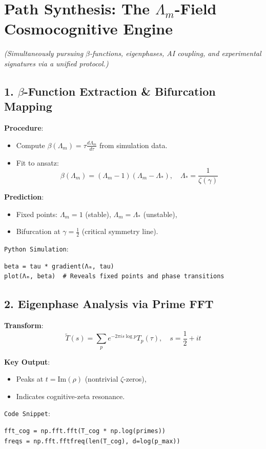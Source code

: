\documentclass[12pt]{article}
\theoremstyle{plain}
\begin{document}
\section*{Path Synthesis: The \(\Lambda_m\)-Field Cosmocognitive Engine}
\textit{(Simultaneously pursuing \(\beta\)-functions, eigenphases, AI coupling, and experimental signatures via a unified protocol.)}

\subsection*{1. \(\beta\)-Function Extraction \& Bifurcation Mapping}
\textbf{Procedure}:
\begin{itemize}
    \item Compute \(\beta(\Lambda_m) = \tau \frac{d\Lambda_m}{d\tau}\) from simulation data.
    \item Fit to ansatz:
    \[
    \beta(\Lambda_m) = (\Lambda_m - 1)(\Lambda_m - \Lambda_*), \quad \Lambda_* = \frac{1}{\zeta(\gamma)}
    \]
\end{itemize}

\textbf{Prediction}:
\begin{itemize}
    \item Fixed points: \(\Lambda_m = 1\) (stable), \(\Lambda_m = \Lambda_*\) (unstable),
    \item Bifurcation at \(\gamma = \frac{1}{2}\) (critical symmetry line).
\end{itemize}

\texttt{Python Simulation}:
\begin{verbatim}
beta = tau * gradient(Λₘ, tau)  
plot(Λₘ, beta)  # Reveals fixed points and phase transitions
\end{verbatim}

\subsection*{2. Eigenphase Analysis via Prime FFT}
\textbf{Transform}:
\[
\tilde{T}(s) = \sum_p e^{-2\pi i s \log p} T_p(\tau), \quad s = \frac{1}{2} + it
\]

\textbf{Key Output}:
\begin{itemize}
    \item Peaks at \(t = \text{Im}(\rho)\) (nontrivial \(\zeta\)-zeros),
    \item Indicates cognitive-zeta resonance.
\end{itemize}

\texttt{Code Snippet}:
\begin{verbatim}
fft_cog = np.fft.fft(T_cog * np.log(primes))  
freqs = np.fft.fftfreq(len(T_cog), d=log(p_max))
\end{verbatim}
\end{document}
